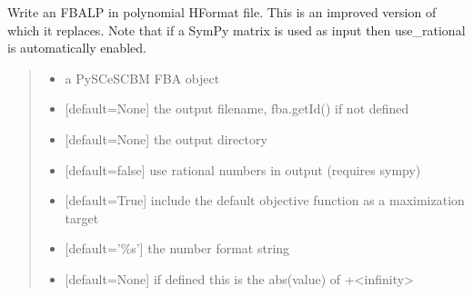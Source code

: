 \documentclass[letterpaper,12pt,english]{sphinxmanual}
\begin{document}
\begin{fulllineitems}

\pysigstartsignatures
\pysiglinewithargsret
{}
{\sphinxparamcomma {}\sphinxparamcomma {}\sphinxparamcomma {}\sphinxparamcomma {}\sphinxparamcomma {}\sphinxparamcomma {}}
{}
\pysigstopsignatures
\sphinxAtStartPar
Write an FBA\sphinxhyphen{}LP in polynomial H\sphinxhyphen{}Format file. This is an improved version of  which it replaces. Note that if a SymPy matrix is used as input then use\_rational is automatically enabled.
\begin{quote}\begin{description}
\begin{itemize}
\item {} 
\sphinxAtStartPar
{} \textendash{} a PySCeS\sphinxhyphen{}CBM FBA object

\item {} 
\sphinxAtStartPar
{} \textendash{} {[}default=None{]} the output filename, fba.getId() if not defined

\item {} 
\sphinxAtStartPar
{} \textendash{} {[}default=None{]} the output directory

\item {} 
\sphinxAtStartPar
{} \textendash{} {[}default=false{]} use rational numbers in output (requires sympy)

\item {} 
\sphinxAtStartPar
{} \textendash{} {[}default=True{]} include the default objective function as a maximization target

\item {} 
\sphinxAtStartPar
{} \textendash{} {[}default=’\%s’{]} the number format string

\item {} 
\sphinxAtStartPar
{} \textendash{} {[}default=None{]} if defined this is the abs(value) of +\sphinxhyphen{}\textless{}infinity\textgreater{}

\end{itemize}

\end{description}\end{quote}

\end{fulllineitems}
\end{document}
